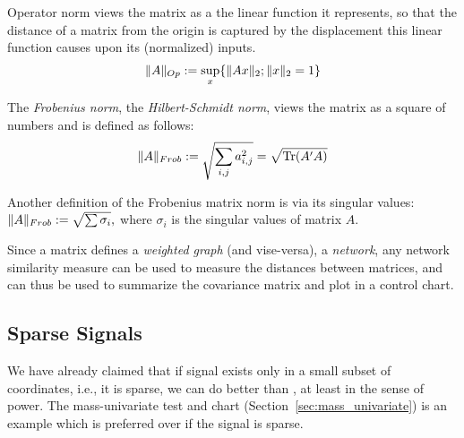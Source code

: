 \begin{definition}
Operator norm views the matrix as a the linear function it represents, so that the distance of a matrix from the origin is captured by the displacement this linear function causes upon its (normalized) inputs.
\begin{align}
	\Vert A \Vert_{Op}:= \sup_x \{ \Vert Ax \Vert_2; \Vert x \Vert_2=1 \}
\end{align}
\end{definition}


\begin{definition}
The \emph{Frobenius norm}, \aka the \emph{Hilbert-Schmidt norm}, views the matrix as a square of numbers and is defined as follows:
\begin{align}
	\Vert A \Vert_{Frob}:= \sqrt{\sum_{i,j} a_{i,j}^2} = \sqrt{\operatorname{Tr}(A'A)}
\end{align}
\end{definition}

\begin{extra}
Another definition of the Frobenius matrix norm is via its singular values:
$ 	\Vert A \Vert_{Frob}:= \sqrt{\sum \sigma_i}, $
where $\sigma_i$ is the singular values of matrix $A$.
\end{extra}


\begin{extra}
Since a matrix defines a \emph{weighted graph} (and vise-versa), \aka a \emph{network}, any network similarity measure can be used to measure the distances between matrices, and can thus be used to summarize the covariance matrix and plot in a control chart.
\end{extra}





\subsection{Sparse Signals}

We have already claimed that if signal exists only in a small subset of coordinates, i.e., it is sparse, we can do better than \tsq, at least in the sense of power.
The mass-univariate test and chart (Section~\ref{sec:mass_univariate}) is an example which is preferred over \tsq if the signal is sparse.



